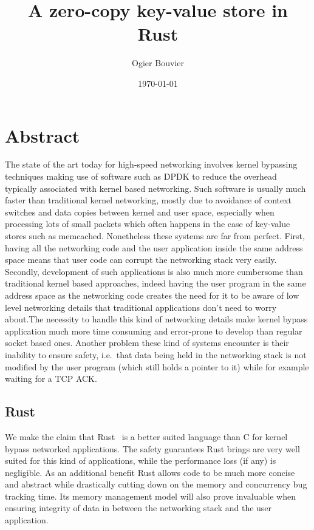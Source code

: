 \documentclass[11pt]{article}
\author{Ogier Bouvier}
\date{\today}
\title{A zero-copy key-value store in Rust}
\begin{document}
\maketitle
{}
\tableofcontents
\newpage

\setcounter{page}{1}
\section{Abstract}

The state of the art today for high-speed networking involves kernel
bypassing techniques making use of software such as DPDK to reduce the
overhead typically associated with kernel based networking. Such
software is usually much faster than traditional kernel networking,
mostly due to avoidance of context switches and data copies between
kernel and user space, especially when processing lots of small
packets which often happens in the case of key-value stores such as
memcached. Nonetheless these systems are far from perfect. First,
having all the  networking code and the user application inside the
same address space means that user code can corrupt the networking
stack very easily. Secondly, development of such applications is also
much more cumbersome than traditional kernel based approaches, indeed
having the user program in the same address space as the networking
code creates the need for it to be aware of low level networking
details that traditional applications don't need to worry about.The
necessity to handle this kind of networking details make kernel bypass
application much more time consuming and error-prone to develop than
regular socket based ones. Another problem these kind of systems
encounter is their inability to ensure safety, i.e.\ that data being
held in the networking stack is not modified by the user program
(which still holds a pointer to it) while for example waiting for a
TCP ACK.

\subsection{Rust}

We make the claim that Rust~\cite{rustbook} is a better suited
language than C for kernel bypass networked applications. The safety
guarantees Rust brings are very well suited for this kind of
applications, while the performance loss (if any) is negligible. As an
additional benefit Rust allows code to be much more concise and
abstract while drastically cutting down on the memory and concurrency
bug tracking time. Its memory management model will also prove
invaluable when ensuring integrity of data in between the networking
stack and the user application.
\end{document}
